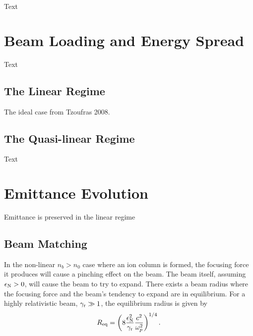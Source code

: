 Text


\section{Beam Loading and Energy Spread}
\label{Sim:BLoad}

Text


\subsection{The Linear Regime}
\label{Sim:Lin}

The ideal case from Tzoufras 2008.


\subsection{The Quasi-linear Regime}
\label{Sim:QLin}

Text


\section{Emittance Evolution}
\label{Sim:Emitt}

Emittance is preserved in the linear regime


\subsection{Beam Matching}
\label{Sim:Match}

In the non-linear $n_{b} > n_{0}$ case where an ion column is formed, the focusing force it produces will cause a pinching effect on the beam. The beam itself, assuming $\epsilon_{\mathrm{N}} > 0$, will cause the beam to try to expand. There exists a beam radius where the focusing force and the beam's tendency to expand are in equilibrium. For a highly relativistic beam, $\gamma_{\mathrm{r}} \gg 1$, the equilibrium radius is given by \cite{krall:1995}
\begin{equation}
    R_{\mathrm{eq}} = \left( 8 \frac{\epsilon_{\mathrm{N}}^2}{\gamma_{\mathrm{r}}} \frac{c^2}{\omega_{p}^2} \right)^{1/4}. \label{EQ:Sim:Req}
\end{equation}

